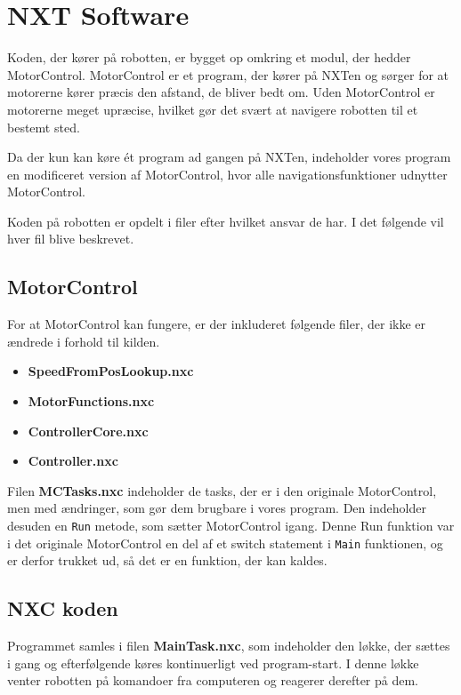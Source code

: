 \section{NXT Software}
Koden, der kører på robotten, er bygget op omkring et modul, der hedder MotorControl. \cite{MotorControl}
MotorControl er et program, der kører på NXTen og sørger for at motorerne kører præcis den afstand, de bliver bedt om. 
Uden MotorControl er motorerne meget upræcise, hvilket gør det svært at navigere robotten til et bestemt sted.

Da der kun kan køre ét program ad gangen på NXTen, indeholder vores program en modificeret version af MotorControl, hvor alle navigationsfunktioner udnytter MotorControl.

Koden på robotten er opdelt i filer efter hvilket ansvar de har.
I det følgende vil hver fil blive beskrevet.

\subsection{MotorControl}
For at MotorControl kan fungere, er der inkluderet følgende filer, der ikke er ændrede i forhold til kilden.

\begin{itemize}
\item \textbf{SpeedFromPosLookup.nxc}
\item \textbf{MotorFunctions.nxc}
\item \textbf{ControllerCore.nxc}
\item \textbf{Controller.nxc}
\end{itemize}

Filen \textbf{MCTasks.nxc} indeholder de tasks, der er i den originale MotorControl, men med ændringer, som gør dem brugbare i vores program.
Den indeholder desuden en \lstinline[style=c]!Run! metode, som sætter MotorControl igang. 
Denne Run funktion var i det originale MotorControl en del af et switch statement i \lstinline[style=c]!Main! funktionen, og er derfor trukket ud, så det er en funktion, der kan kaldes.

\subsection{NXC koden}

Programmet samles i filen \textbf{MainTask.nxc}, som indeholder den løkke, der sættes i gang og efterfølgende køres kontinuerligt ved program-start. 
I denne løkke venter robotten på komandoer fra computeren og reagerer derefter på dem.

